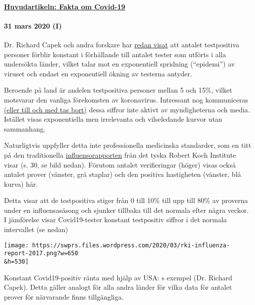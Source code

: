 \hypertarget{huvudartikeln-fakta-om-covid-19}{%
\paragraph{\texorpdfstring{\href{https://swprs.org/fakta-om-covid-19/}{Huvudartikeln:
Fakta om
Covid-19}}{Huvudartikeln: Fakta om Covid-19}}\label{huvudartikeln-fakta-om-covid-19}}

\hypertarget{31-mars-2020-i}{%
\paragraph{31 mars 2020 (I)}\label{31-mars-2020-i}}

Dr. Richard Capek och andra forskare har
\href{https://coronadaten.wordpress.com/}{redan visat} att antalet
testpositiva personer förblir konstant i förhållande till antalet tester
som utförts i alla undersökta länder, vilket talar mot en exponentiell
spridning (``epidemi'') av viruset och endast en exponentiell ökning av
testerna antyder.

Beroende på land är andelen testpositiva personer mellan 5 och 15\%,
vilket motsvarar den vanliga förekomsten av koronavirus. Intressant nog
kommuniceras
\href{https://multipolar-magazin.de/artikel/coronavirus-irrefuhrung-fallzahlen}{(eller
till och med tas bort)} dessa siffror inte aktivt av myndigheterna och
media. Istället visas exponentiella men irrelevanta och vilseledande
kurvor utan sammanhang.

Naturligtvis uppfyller detta inte professionella medicinska standarder,
som en titt på den traditionella
\href{https://influenza.rki.de/Saisonberichte/2017.pdf}{influensorapporten}
från det tyska Robert Koch Institute visar (s. 30, se bild nedan).
Förutom antalet verifieringar (höger) visas också antalet prover
(vänster, grå staplar) och den positiva hastigheten (vänster, blå kurva)
här.

Detta visar att de testpositiva stiger från 0 till 10\% till upp till
80\% av proverna under en influensasäsong och sjunker tillbaka till det
normala efter några veckor. I jämförelse visar Covid19-tester konstant
testpositiv siffror i det normala intervallet (se nedan)

\texttt{[image: https://swprs.files.wordpress.com/2020/03/rki-influenza-report-2017.png?w=650\\\&h=530]}

Konstant Covid19-positiv ränta med hjälp av USA: s exempel (Dr. Richard
Capek). Detta gäller analogt för alla andra länder för vilka data för
antalet prover för närvarande finns tillgängliga.

